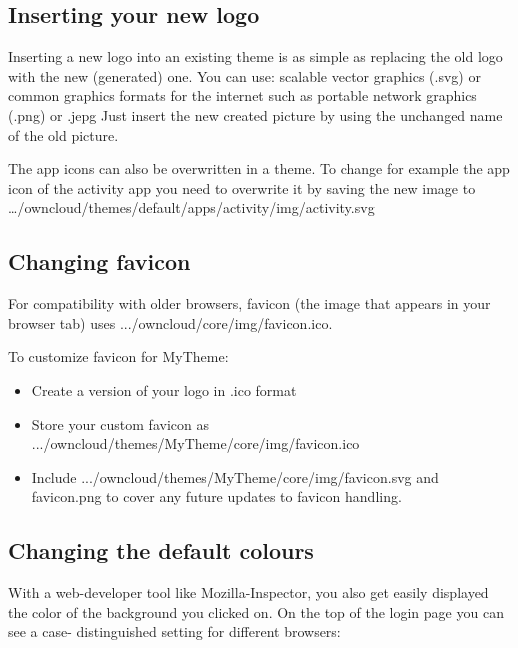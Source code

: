 \documentclass[letterpaper,10pt,english]{sphinxmanual}
\begin{document}
\subsection{Inserting your new logo}
\label{core/theming:inserting-your-new-logo}
Inserting a new logo into an existing theme is as simple as replacing the old logo with the new (generated) one.
You can use: scalable vector graphics (.svg) or common graphics formats for the internet such as portable network graphics (.png) or .jepg
Just insert the new created picture by using the unchanged name of the old picture.

The app icons can also be overwritten in a theme. To change for example the app icon of the activity app you need to overwrite it by saving the new image to …/owncloud/themes/default/apps/activity/img/activity.svg


\subsection{Changing favicon}
\label{core/theming:changing-favicon}
For compatibility with older browsers, favicon (the image that appears in your browser tab) uses .../owncloud/core/img/favicon.ico.

To customize favicon for MyTheme:
\begin{itemize}
\item {} 
Create a version of your logo in .ico format

\item {} 
Store your custom favicon as .../owncloud/themes/MyTheme/core/img/favicon.ico

\item {} 
Include .../owncloud/themes/MyTheme/core/img/favicon.svg and favicon.png to cover any future updates to favicon handling.

\end{itemize}


\subsection{Changing the default colours}
\label{core/theming:changing-the-default-colours}
With a web-developer tool like Mozilla-Inspector, you also get easily displayed the color of the background you clicked on.
On the top of the login page you can see a case- distinguished setting for different browsers:
\end{document}
